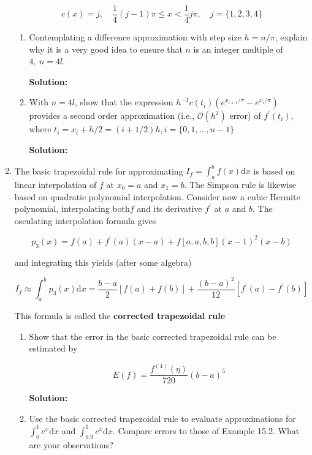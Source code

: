 \documentclass[12pt]{article}
\newcommand{\BigO}[1]{\mathcal{O}\left( #1 \right)}
\begin{document}
\begin{enumerate}
\[
	c(x) = j, \quad \frac{1}{4}(j-1)\pi \leq x < \frac{1}{4}j\pi, \quad j = \{ 1, 2, 3, 4\}
\]

\begin{enumerate}
\item Contemplating a difference approximation with step size $h = n/\pi$, explain why it is a very good idea to ensure that $n$ is an integer multiple of $4,\ n = 4l$. 

{\bf Solution:}

\item With $n = 4l$, show that the expression $h^{-1}c(t_{i})\left( e^{x_{i+1}/\pi} - e^{x_{i}/\pi}\right)$ provides a second order approximation (i.e., $\BigO{h^{2}}$ error) of $f^{\prime}(t_{i})$, where $t_{i} = x_{i} + h/2 = (i + 1/2)h, i = \{ 0, 1, \ldots, n-1\}$

{\bf Solution:}


\end{enumerate}

\item The basic trapezoidal rule for approximating $I_{f} = \int_{a}^{b}f(x)\text{d}x$ is based on linear interpolation of $f$ at $x_{0} = a$ and $x_{1} = b$. The Simpson rule is likewise based on quadratic polynomial interpolation. Consider now a cubic Hermite polynomial, interpolating both$f$ and its derivative $f^{\prime}$ at $a$ and $b$. The osculating interpolation formula gives

\[
	p_{3}(x) = f(a) + f^{\prime}(a)(x-a) + f[a,a,b,b](x-1)^{2}(x - b)
\]

and integrating this yields (after some algebra)

\[
	I_{f} \approx \int_{a}^{b} p_{3}(x)\text{d}x = \frac{b-a}{2}[f(a) + f(b)] + \frac{(b-a)^{2}}{12}[f^{\prime}(a) - f^{\prime}(b)]
\]

This formula is called the {\bf corrected trapezoidal rule}

\begin{enumerate}
\item Show that the error in the basic corrected trapezoidal rule can be estimated by

\[
	E(f) = \frac{f^{(4)}(\eta)}{720}(b-a)^{5}
\]

{\bf Solution:}

\item Use the basic corrected trapezoidal rule to evaluate approximations for $\int_{0}^{1}e^{x}\text{d}x$ and $\int_{0.9}^{1}e^{x}\text{d}x$. Compare errors to those of Example 15.2. What are your observations?


\end{enumerate}
\end{enumerate}
\end{document}
